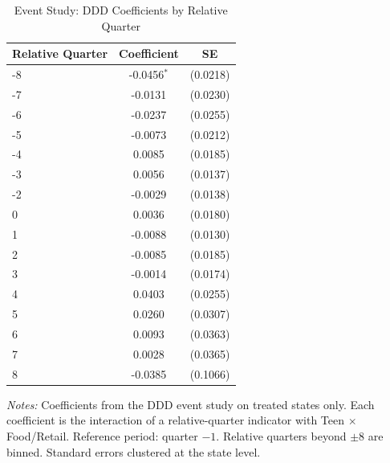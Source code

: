 \begin{table}[htbp]
\centering
\caption{Event Study: DDD Coefficients by Relative Quarter}
\label{tab:eventstudy}
\begin{threeparttable}
\begin{tabular}{lcc}
\toprule
Relative Quarter & Coefficient & SE \\
\midrule
-8 & -0.0456$^{*}$ & (0.0218) \\
-7 & -0.0131 & (0.0230) \\
-6 & -0.0237 & (0.0255) \\
-5 & -0.0073 & (0.0212) \\
-4 & 0.0085 & (0.0185) \\
-3 & 0.0056 & (0.0137) \\
-2 & -0.0029 & (0.0138) \\
0 & 0.0036 & (0.0180) \\
1 & -0.0088 & (0.0130) \\
2 & -0.0085 & (0.0185) \\
3 & -0.0014 & (0.0174) \\
4 & 0.0403 & (0.0255) \\
5 & 0.0260 & (0.0307) \\
6 & 0.0093 & (0.0363) \\
7 & 0.0028 & (0.0365) \\
8 & -0.0385 & (0.1066) \\
\bottomrule
\end{tabular}
\begin{tablenotes}[flushleft]\small
\item \textit{Notes:} Coefficients from the DDD event study on treated states only. Each coefficient is the interaction of a relative-quarter indicator with Teen $\times$ Food/Retail. Reference period: quarter $-1$. Relative quarters beyond $\pm 8$ are binned. Standard errors clustered at the state level.
\end{tablenotes}
\end{threeparttable}
\end{table}

